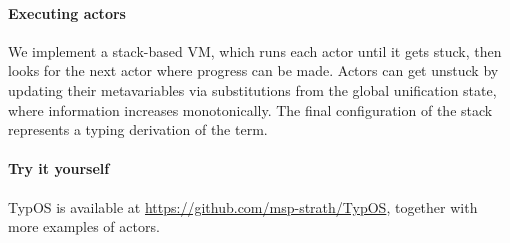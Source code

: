 \documentclass{easychair}
\newcommand{\TypOS}{TypOS\xspace}
\begin{document}
\paragraph{Executing actors}
We implement a stack-based VM, which runs each actor until it gets stuck,
then looks for the next actor where progress can be made.
Actors can get unstuck by updating their metavariables via substitutions from the
global unification state, where information increases monotonically.
The final configuration of the stack represents a typing derivation of the term.


\paragraph{Try it yourself}
\TypOS is available at \url{https://github.com/msp-strath/TypOS}, together with more examples of actors.








%
%
\end{document}
